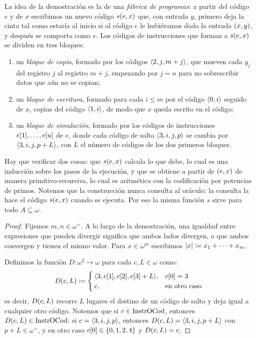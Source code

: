 \begin{agregado}
\begin{agregado}
\begin{correccion}
La idea de la demostración es la de una \emph{fábrica de programas}: a partir del código $e$ y de $x$ escribimos un nuevo código $s\pa*{e, x}$ que, con entrada $y$, primero deja la cinta tal como estaría al inicio si al código $e$ le hubiéramos dado la entrada $\pa*{x, y}$, y después se comporta como $e$. Los códigos de instrucciones que forman a $s\pa*{e, x}$ se dividen en tres bloques:
\begin{enumerate}
	\item un \emph{bloque de copia}, formado por los códigos $\inner*{2, j, m + j}$, que mueven cada $y_{j}$ del registro $j$ al registro $m + j$, empezando por $j = n$ para no sobrescribir datos que aún no se copian;
	\item un \emph{bloque de escritura}, formado para cada $i\leq m$ por el código $\inner*{0, i}$ seguido de $x_{i}$ copias del código $\inner*{1, i}$, de modo que $x$ queda escrito en el código;
	\item un \emph{bloque de simulación}, formado por los códigos de instrucciones $e\bra*{1},\dotsc, e\bra*{u}$ de $e$, donde cada código de salto $\inner*{3, i, j, p}$ se cambia por $\inner*{3, i, j, p + L}$, con $L$ el número de códigos de los dos primeros bloques.
\end{enumerate}
Hay que verificar dos cosas: que $s\pa*{e, x}$ calcula lo que debe, lo cual es una inducción sobre los pasos de la ejecución, y que se obtiene a partir de $\pa*{e, x}$ de manera primitivo-recursiva, lo cual es aritmética con la codificación por potencias de primos. Notemos que la construcción nunca consulta al oráculo: la consulta la hace el código $s\pa*{e, x}$ cuando se ejecuta. Por eso la misma función $s$ sirve para todo $A\subseteq\omega$.

\begin{proof}
	Fijemos $m, n\in\omega^{+}$. A lo largo de la demostración, una igualdad entre expresiones que pueden divergir significa que ambos lados divergen, o que ambos convergen y tienen el mismo valor. Para $x\in\omega^{m}$ escribimos $\abs*{x}\coloneqq x_{1} +\dotsb + x_{m}$.

	Definimos la función $D:\omega^{2}\to\omega$ para cada $c, L\in\omega$ como:
	\[
		D\pa*{c, L}\coloneqq
		\begin{cases}
			\inner*{3, c\bra*{1}, c\bra*{2}, c\bra*{3} + L}, & c\bra*{0} = 3\\
			c, &\text{en otro caso}
		\end{cases}
	\]
	es decir, $D\pa*{c, L}$ recorre $L$ lugares el destino de un código de salto y deja igual a cualquier otro código. Notemos que si $c\in\INSTRUCCIONESOCOD$, entonces $D\pa*{c, L}\in\INSTRUCCIONESOCOD$: si $c =\inner*{3, i, j, p}$, entonces $D\pa*{c, L} =\inner*{3, i, j, p + L}$ con $p + L\in\omega^{+}$, y en otro caso $c\bra*{0}\in\set*{0, 1, 2, 4}$ y $D\pa*{c, L} = c$.


\end{proof}
\end{correccion}
\end{agregado}
\end{agregado}
